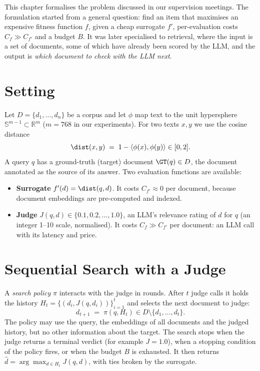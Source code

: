
This chapter formalises the problem discussed in our supervision meetings. The formulation started from a general question: find an item that maximises an expensive fitness function $f$, given a cheap surrogate $f'$, per-evaluation costs $C_f \gg C_{f'}$ and a budget $B$. It was later specialised to retrieval, where the input is a set of documents, some of which have already been scored by the LLM, and the output is \emph{which document to check with the LLM next}.

\section{Setting}

Let $D=\{d_1,\dots,d_n\}$ be a corpus and let $\phi$ map text to the unit hypersphere $\mathbb{S}^{m-1}\subset\mathbb{R}^m$ ($m=768$ in our experiments). For two texts $x,y$ we use the cosine distance
\begin{equation}
  \dist(x,y) \;=\; 1-\langle \phi(x),\phi(y)\rangle \in [0,2].
\end{equation}
A query $q$ has a ground-truth (target) document $\GT(q)\in D$, the document annotated as the source of its answer. Two evaluation functions are available:
\begin{itemize}
  \item \textbf{Surrogate} $f'(d)=\dist(q,d)$. It costs $C_{f'}\approx 0$ per document, because document embeddings are pre-computed and indexed.
  \item \textbf{Judge} $J(q,d)\in\{0.1,0.2,\dots,1.0\}$, an LLM's relevance rating of $d$ for $q$ (an integer 1--10 scale, normalised). It costs $C_f\gg C_{f'}$ per document: an LLM call with its latency and price.
\end{itemize}

\section{Sequential Search with a Judge}

A \emph{search policy} $\pi$ interacts with the judge in rounds. After $t$ judge calls it holds the history $H_t=\{(d_i,J(q,d_i))\}_{i=1}^{t}$ and selects the next document to judge:
\begin{equation}
  d_{t+1} \;=\; \pi(q, H_t) \in D\setminus\{d_1,\dots,d_t\}.
\end{equation}
The policy may use the query, the embeddings of all documents and the judged history, but no other information about the target. The search stops when the judge returns a terminal verdict (for example $J=1.0$), when a stopping condition of the policy fires, or when the budget $B$ is exhausted. It then returns $\hat d=\arg\max_{d\in H_t} J(q,d)$, with ties broken by the surrogate.

